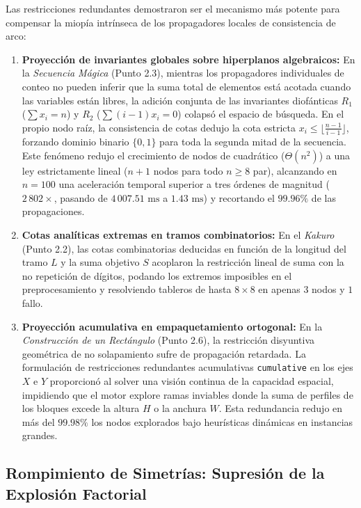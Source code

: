 Las restricciones redundantes demostraron ser el mecanismo más potente para compensar la miopía intrínseca de los propagadores locales de consistencia de arco:

\begin{enumerate}
    \item \textbf{Proyección de invariantes globales sobre hiperplanos algebraicos:}
    En la \textit{Secuencia Mágica} (Punto 2.3), mientras los propagadores individuales de conteo no pueden inferir que la suma total de elementos está acotada cuando las variables están libres, la adición conjunta de las invariantes diofánticas $R_1$ ($\sum x_i = n$) y $R_2$ ($\sum (i-1)x_i = 0$) colapsó el espacio de búsqueda. En el propio nodo raíz, la consistencia de cotas dedujo la cota estricta $x_i \le \lfloor \frac{n-1}{i-1} \rfloor$, forzando dominio binario $\{0, 1\}$ para toda la segunda mitad de la secuencia. Este fenómeno redujo el crecimiento de nodos de cuadrático ($\Theta(n^2)$) a una ley estrictamente lineal ($n+1$ nodos para todo $n \ge 8$ par), alcanzando en $n=100$ una aceleración temporal superior a tres órdenes de magnitud ($2\,802\times$, pasando de $4\,007.51\text{ ms}$ a $1.43\text{ ms}$) y recortando el $99.96\%$ de las propagaciones.
    
    \item \textbf{Cotas analíticas extremas en tramos combinatorios:}
    En el \textit{Kakuro} (Punto 2.2), las cotas combinatorias deducidas en función de la longitud del tramo $L$ y la suma objetivo $S$ acoplaron la restricción lineal de suma con la no repetición de dígitos, podando los extremos imposibles en el preprocesamiento y resolviendo tableros de hasta $8\times 8$ en apenas $3$ nodos y $1$ fallo.
    
    \item \textbf{Proyección acumulativa en empaquetamiento ortogonal:}
    En la \textit{Construcción de un Rectángulo} (Punto 2.6), la restricción disyuntiva geométrica de no solapamiento sufre de propagación retardada. La formulación de restricciones redundantes acumulativas \texttt{cumulative} en los ejes $X$ e $Y$ proporcionó al solver una visión continua de la capacidad espacial, impidiendo que el motor explore ramas inviables donde la suma de perfiles de los bloques excede la altura $H$ o la anchura $W$. Esta redundancia redujo en más del $99.98\%$ los nodos explorados bajo heurísticas dinámicas en instancias grandes.
\end{enumerate}

\subsection{Rompimiento de Simetrías: Supresión de la Explosión Factorial}

